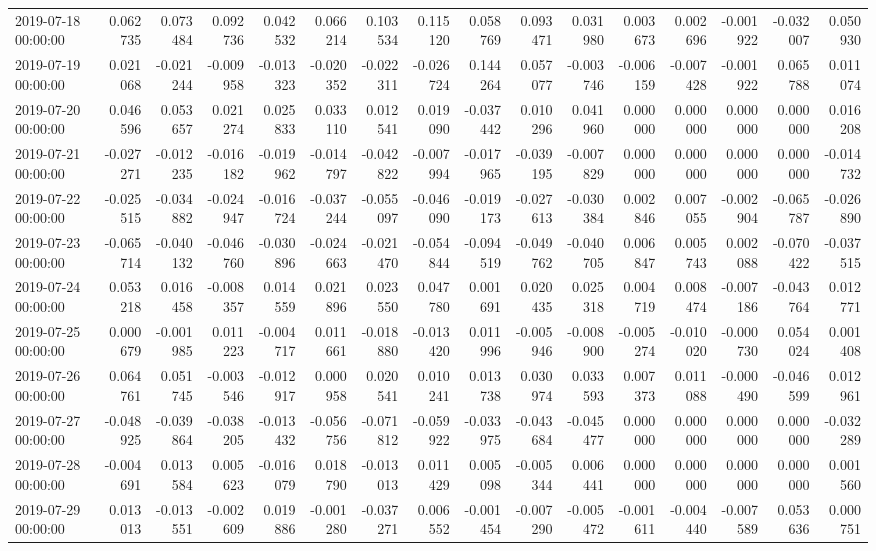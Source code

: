 \begin{tabular}{lrrrrrrrrrrrrrrr}
2019-07-18 00:00:00 & 0.062735 & 0.073484 & 0.092736 & 0.042532 & 0.066214 & 0.103534 & 0.115120 & 0.058769 & 0.093471 & 0.031980 & 0.003673 & 0.002696 & -0.001922 & -0.032007 & 0.050930 \\
2019-07-19 00:00:00 & 0.021068 & -0.021244 & -0.009958 & -0.013323 & -0.020352 & -0.022311 & -0.026724 & 0.144264 & 0.057077 & -0.003746 & -0.006159 & -0.007428 & -0.001922 & 0.065788 & 0.011074 \\
2019-07-20 00:00:00 & 0.046596 & 0.053657 & 0.021274 & 0.025833 & 0.033110 & 0.012541 & 0.019090 & -0.037442 & 0.010296 & 0.041960 & 0.000000 & 0.000000 & 0.000000 & 0.000000 & 0.016208 \\
2019-07-21 00:00:00 & -0.027271 & -0.012235 & -0.016182 & -0.019962 & -0.014797 & -0.042822 & -0.007994 & -0.017965 & -0.039195 & -0.007829 & 0.000000 & 0.000000 & 0.000000 & 0.000000 & -0.014732 \\
2019-07-22 00:00:00 & -0.025515 & -0.034882 & -0.024947 & -0.016724 & -0.037244 & -0.055097 & -0.046090 & -0.019173 & -0.027613 & -0.030384 & 0.002846 & 0.007055 & -0.002904 & -0.065787 & -0.026890 \\
2019-07-23 00:00:00 & -0.065714 & -0.040132 & -0.046760 & -0.030896 & -0.024663 & -0.021470 & -0.054844 & -0.094519 & -0.049762 & -0.040705 & 0.006847 & 0.005743 & 0.002088 & -0.070422 & -0.037515 \\
2019-07-24 00:00:00 & 0.053218 & 0.016458 & -0.008357 & 0.014559 & 0.021896 & 0.023550 & 0.047780 & 0.001691 & 0.020435 & 0.025318 & 0.004719 & 0.008474 & -0.007186 & -0.043764 & 0.012771 \\
2019-07-25 00:00:00 & 0.000679 & -0.001985 & 0.011223 & -0.004717 & 0.011661 & -0.018880 & -0.013420 & 0.011996 & -0.005946 & -0.008900 & -0.005274 & -0.010020 & -0.000730 & 0.054024 & 0.001408 \\
2019-07-26 00:00:00 & 0.064761 & 0.051745 & -0.003546 & -0.012917 & 0.000958 & 0.020541 & 0.010241 & 0.013738 & 0.030974 & 0.033593 & 0.007373 & 0.011088 & -0.000490 & -0.046599 & 0.012961 \\
2019-07-27 00:00:00 & -0.048925 & -0.039864 & -0.038205 & -0.013432 & -0.056756 & -0.071812 & -0.059922 & -0.033975 & -0.043684 & -0.045477 & 0.000000 & 0.000000 & 0.000000 & 0.000000 & -0.032289 \\
2019-07-28 00:00:00 & -0.004691 & 0.013584 & 0.005623 & -0.016079 & 0.018790 & -0.013013 & 0.011429 & 0.005098 & -0.005344 & 0.006441 & 0.000000 & 0.000000 & 0.000000 & 0.000000 & 0.001560 \\
2019-07-29 00:00:00 & 0.013013 & -0.013551 & -0.002609 & 0.019886 & -0.001280 & -0.037271 & 0.006552 & -0.001454 & -0.007290 & -0.005472 & -0.001611 & -0.004440 & -0.007589 & 0.053636 & 0.000751 \\

\end{tabular}
